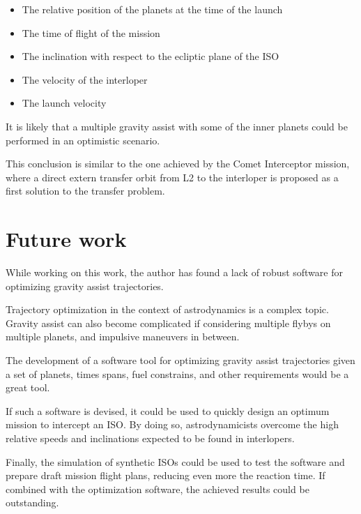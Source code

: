 \begin{itemize}
  \item The relative position of the planets at the time of the launch
  \item The time of flight of the mission
  \item The inclination with respect to the ecliptic plane of the ISO
  \item The velocity of the interloper
  \item The launch velocity
\end{itemize}

It is likely that a multiple gravity assist with some of the inner planets could
be performed in an optimistic scenario.

This conclusion is similar to the one achieved by the Comet Interceptor mission,
where a direct extern transfer orbit from L2 to the interloper is proposed as a
first solution to the transfer problem.

\section{Future work}

While working on this work, the author has found a lack of robust software for
optimizing gravity assist trajectories.

Trajectory optimization in the context of astrodynamics is a complex topic.
Gravity assist can also become complicated if considering multiple flybys on
multiple planets, and impulsive maneuvers in between.

The development of a software tool for optimizing gravity assist trajectories
given a set of planets, times spans, fuel constrains, and other requirements
would be a great tool.

If such a software is devised, it could be used to quickly design an optimum
mission to intercept an ISO. By doing so, astrodynamicists overcome the high
relative speeds and inclinations expected to be found in interlopers.

Finally, the simulation of synthetic ISOs could be used to test the software and
prepare draft mission flight plans, reducing even more the reaction time. If
combined with the optimization software, the achieved results could be
outstanding.
